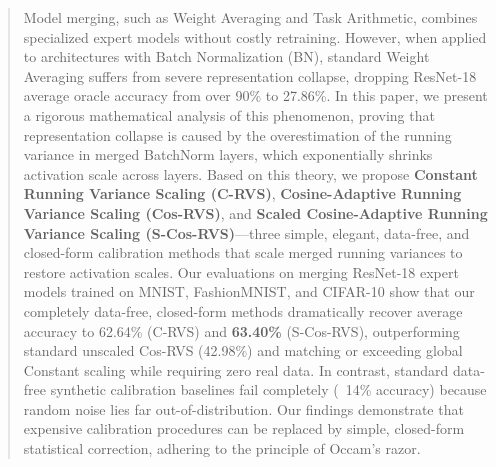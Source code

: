 \documentclass{article}
\theoremstyle{plain}
\theoremstyle{definition}
\theoremstyle{remark}
\begin{document}

\printAffiliationsAndNotice{}

\begin{abstract}
  Model merging, such as Weight Averaging and Task Arithmetic, combines specialized expert models without costly retraining. However, when applied to architectures with Batch Normalization (BN), standard Weight Averaging suffers from severe representation collapse, dropping ResNet-18 average oracle accuracy from over 90\% to 27.86\%. In this paper, we present a rigorous mathematical analysis of this phenomenon, proving that representation collapse is caused by the overestimation of the running variance in merged BatchNorm layers, which exponentially shrinks activation scale across layers. Based on this theory, we propose \textbf{Constant Running Variance Scaling (C-RVS)}, \textbf{Cosine-Adaptive Running Variance Scaling (Cos-RVS)}, and \textbf{Scaled Cosine-Adaptive Running Variance Scaling (S-Cos-RVS)}—three simple, elegant, data-free, and closed-form calibration methods that scale merged running variances to restore activation scales. Our evaluations on merging ResNet-18 expert models trained on MNIST, FashionMNIST, and CIFAR-10 show that our completely data-free, closed-form methods dramatically recover average accuracy to 62.64\% (C-RVS) and \textbf{63.40\%} (S-Cos-RVS), outperforming standard unscaled Cos-RVS (42.98\%) and matching or exceeding global Constant scaling while requiring zero real data. In contrast, standard data-free synthetic calibration baselines fail completely (~14\% accuracy) because random noise lies far out-of-distribution. Our findings demonstrate that expensive calibration procedures can be replaced by simple, closed-form statistical correction, adhering to the principle of Occam's razor.
\end{abstract}
\end{document}
